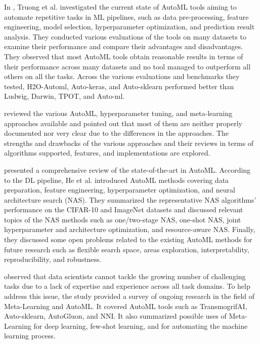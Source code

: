 In \cite{8995391}, Truong et al. investigated the current state of AutoML tools aiming to automate repetitive tasks in ML pipelines, such as data pre-processing, feature engineering, model selection, hyperparameter optimization, and prediction result analysis.
They conducted various evaluations of the tools on many datasets to examine their performance and compare their advantages and disadvantages.
They observed that most AutoML tools obtain reasonable results in terms of their performance across many datasets and no tool managed to outperform all others on all the tasks.
Across the various evaluations and benchmarks they tested, H2O-Automl, Auto-keras, and Auto-sklearn performed better than Ludwig, Darwin, TPOT, and Auto-ml.

\cite{9033810} reviewed the various AutoML, hyperparameter tuning, and meta-learning approaches available and pointed out that most of them are neither properly documented nor very clear due to the differences in the approaches.
The strengths and drawbacks of the various approaches and their reviews in terms of algorithms supported, features, and implementations are explored.

\cite{HE2021106622} presented a comprehensive review of the state-of-the-art in AutoML.
According to the DL pipeline, He et al. introduced AutoML methods covering data preparation, feature engineering, hyperparameter optimization, and neural architecture search (NAS).
They summarized the representative NAS algorithms’ performance on the CIFAR-10 and ImageNet datasets and discussed relevant topics of the NAS methods such as one\slash two-stage NAS, one-shot NAS, joint hyperparameter and architecture optimization, and resource-aware NAS.
Finally, they discussed some open problems related to the existing AutoML methods for future research such as flexible search space, areas exploration, interpretability, reproducibility, and robustness.

\cite{9579526} observed that data scientists cannot tackle the growing number of challenging tasks due to a lack of expertise and experience across all task domains.
To help address this issue, the study provided a survey of ongoing research in the field of Meta-Learning and AutoML.
It covered AutoML tools such as TransmogrifAI, Auto-sklearn, AutoGluon, and NNI.
It also summarized possible uses of Meta-Learning for deep learning, few-shot learning, and for automating the machine learning process.

